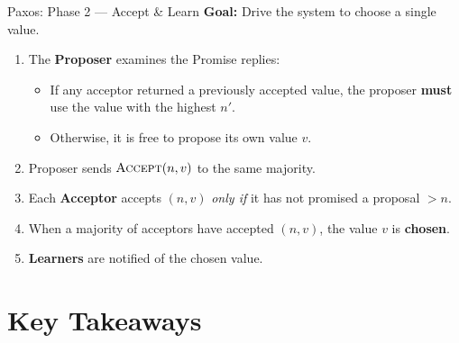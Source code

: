 \documentclass[11pt,aspectratio=169]{beamer}
\begin{document}
\begin{frame}{Paxos: Phase 2 --- Accept \& Learn}
\textbf{Goal:} Drive the system to choose a single value.

\vspace{8pt}
\begin{enumerate}
  \item<2-> The \textbf{Proposer} examines the Promise replies:
    \begin{itemize}
      \item If any acceptor returned a previously accepted value, the proposer \textbf{must} use the value with the highest $n'$.
      \item Otherwise, it is free to propose its own value $v$.
    \end{itemize}
  \item<3-> Proposer sends $\textsc{Accept}(n, v)$ to the same majority.
  \item<4-> Each \textbf{Acceptor} accepts $(n, v)$ \emph{only if} it has not promised a proposal $> n$.
  \item<5-> When a majority of acceptors have accepted $(n, v)$, the value $v$ is \textbf{chosen}.
  \item<6-> \textbf{Learners} are notified of the chosen value.
\end{enumerate}

\vspace{6pt}
\end{frame}

\section{Key Takeaways}
\end{document}
